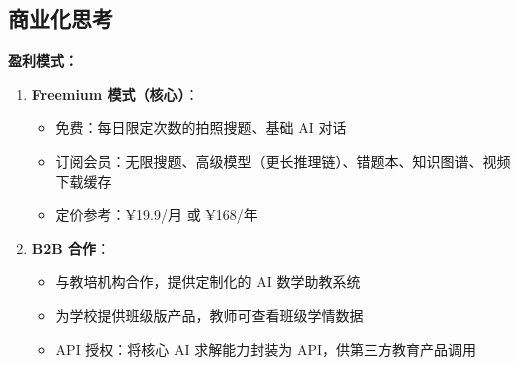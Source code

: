 \documentclass[12pt, a4paper]{ctexart}
\begin{document}
\subsection{商业化思考}
\textbf{盈利模式：}
\begin{enumerate}
    \item \textbf{Freemium 模式（核心）}：
    \begin{itemize}
        \item 免费：每日限定次数的拍照搜题、基础 AI 对话
        \item 订阅会员：无限搜题、高级模型（更长推理链）、错题本、知识图谱、视频下载缓存
        \item 定价参考：¥19.9/月 或 ¥168/年
    \end{itemize}
    \item \textbf{B2B 合作}：
    \begin{itemize}
        \item 与教培机构合作，提供定制化的 AI 数学助教系统
        \item 为学校提供班级版产品，教师可查看班级学情数据
        \item API 授权：将核心 AI 求解能力封装为 API，供第三方教育产品调用
    \end{itemize}
\end{enumerate}
\end{document}
